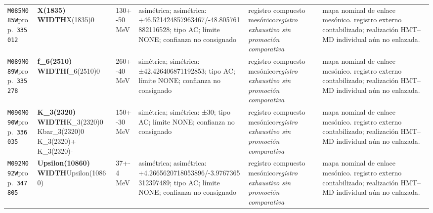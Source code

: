 \begin{landscape}
\begin{longtable}{L{1.85cm}L{4.45cm}L{2.35cm}L{4.05cm}L{3.35cm}L{7.15cm}}
\texttt{M085}\newline \texttt{M085W}\newline prop.\ \texttt{335012} & \textbf{X(1835) WIDTH}\newline X(1835)0 & 130+-50\,MeV & asimétrica; asimétrica: +46.521424857963467/-48.805761882116528; tipo AC; límite NONE; confianza no consignado & registro compuesto mesónico\newline \emph{registro exhaustivo sin promoción comparativa} & mapa nominal de enlace mesónico. registro externo contabilizado; realización HMT--MD individual aún no enlazada. \\
\texttt{M089}\newline \texttt{M089W}\newline prop.\ \texttt{335278} & \textbf{f\_\allowbreak{}6(2510) WIDTH}\newline f\_\allowbreak{}6(2510)0 & 260+-40\,MeV & simétrica; simétrica: ±42.426406871192853; tipo AC; límite NONE; confianza no consignado & registro compuesto mesónico\newline \emph{registro exhaustivo sin promoción comparativa} & mapa nominal de enlace mesónico. registro externo contabilizado; realización HMT--MD individual aún no enlazada. \\
\texttt{M090}\newline \texttt{M090W}\newline prop.\ \texttt{336035} & \textbf{K\_\allowbreak{}3(2320) WIDTH}\newline K\_\allowbreak{}3(2320)0 \textbar{}\allowbreak{} Kbar\_\allowbreak{}3(2320)0 \textbar{}\allowbreak{} K\_\allowbreak{}3(2320)+ \textbar{}\allowbreak{} K\_\allowbreak{}3(2320)- & 150+-30\,MeV & simétrica; simétrica: ±30; tipo AC; límite NONE; confianza no consignado & registro compuesto mesónico\newline \emph{registro exhaustivo sin promoción comparativa} & mapa nominal de enlace mesónico. registro externo contabilizado; realización HMT--MD individual aún no enlazada. \\
\texttt{M092}\newline \texttt{M092W}\newline prop.\ \texttt{347805} & \textbf{Upsilon(10860) WIDTH}\newline Upsilon(10860) & 37+-4\,MeV & asimétrica; asimétrica: +4.2665620718053896/-3.9767365312397489; tipo AC; límite NONE; confianza no consignado & registro compuesto mesónico\newline \emph{registro exhaustivo sin promoción comparativa} & mapa nominal de enlace mesónico. registro externo contabilizado; realización HMT--MD individual aún no enlazada. \\

\end{longtable}
\end{landscape}

